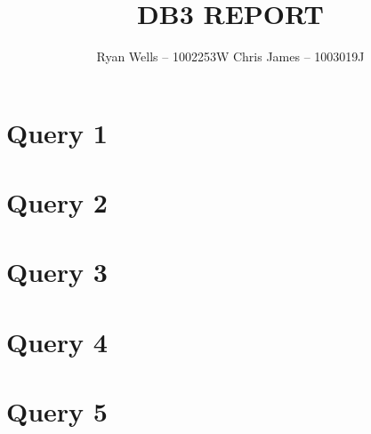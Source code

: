 \documentclass{report}
\title{DB3 REPORT}
\author{Ryan Wells -- 1002253W \n Chris James -- 1003019J}
\begin{document}
\maketitle
\newpage
\section*{Query 1}
\section*{Query 2}
\section*{Query 3}
\section*{Query 4}
\section*{Query 5}
\end{document}
